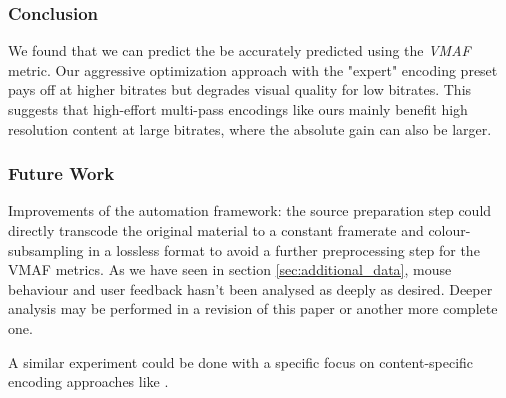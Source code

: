 \subsubsection{Conclusion}
We found that we can predict the be accurately predicted using the \textit{VMAF} metric.
Our aggressive optimization approach with the "expert" encoding preset pays off at higher bitrates but degrades visual quality for low bitrates. This suggests that high-effort multi-pass encodings like ours mainly benefit high resolution content at large bitrates, where the absolute gain can also be larger.


\subsubsection{Future Work}
Improvements of the automation framework: the source preparation step could directly transcode the original material to a constant framerate and colour-subsampling in a lossless format to avoid a further preprocessing step for the VMAF metrics.
As we have seen in section \ref{sec:additional_data}, mouse behaviour and user feedback hasn't been analysed as deeply as desired. 
Deeper analysis may be performed in a revision of this paper or another more complete one.


A similar experiment could be done with a specific focus on content-specific encoding approaches like \cite{cock:2016:titleencode}.

